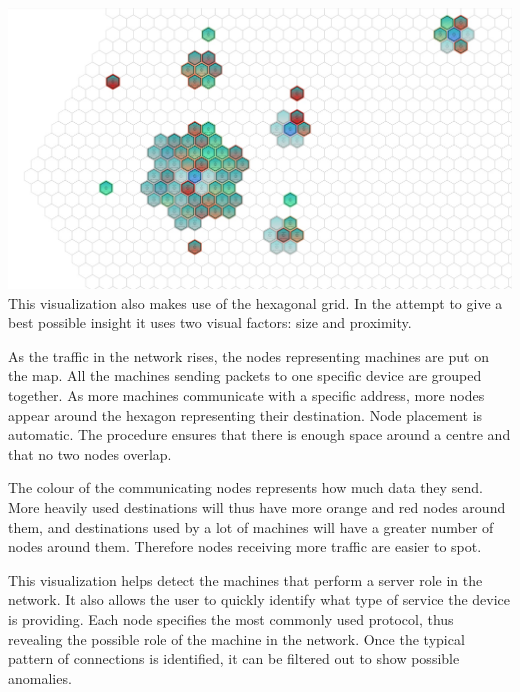 \includegraphics[width=\linewidth]{materials/groups.jpg}
This visualization also makes use of the hexagonal grid. In the attempt to give
a best possible insight it uses two visual factors: size and proximity.

As the traffic in the network rises, the nodes representing machines are put on
the map. All the machines sending packets to one specific device are grouped
together. As more machines communicate with a specific address, more nodes
appear around the hexagon representing their destination. Node placement is
automatic. The procedure ensures that there is enough space around a centre
and that no two nodes overlap.

The colour of the communicating nodes represents how much data they send. More
heavily used destinations will thus have more orange and red nodes around them,
and destinations used by a lot of machines will have a greater number of nodes
around them. Therefore nodes receiving more traffic are easier to spot.

This visualization helps detect the machines that perform a server role in the
network. It also allows the user to quickly identify what type of service the device
is providing. Each node specifies the most commonly used protocol, thus
revealing the possible role of the machine in the network. Once the typical pattern
of connections is identified, it can be filtered out to show possible anomalies.

